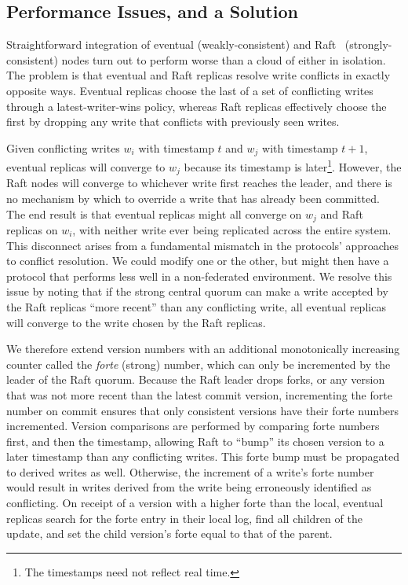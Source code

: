 \documentclass[10pt,conference,letterpaper]{IEEEtran}
\begin{document}
\subsection{Performance Issues, and a Solution}

Straightforward integration of eventual (weakly-consistent) and
Raft~\cite{ongaro_search_2014} (strongly-consistent) nodes turn out to
perform worse than a  cloud of either in isolation.
The problem is that eventual and Raft replicas resolve write conflicts in
exactly opposite ways.
Eventual replicas choose the last of a set of conflicting writes through a
latest-writer-wins policy, whereas Raft replicas effectively choose the first
by dropping any write that conflicts with previously seen writes.

Given conflicting writes $w_i$ with timestamp $t$ and $w_j$ with timestamp
$t+1$, eventual replicas will converge to $w_j$ because its timestamp is
later\footnote{The timestamps need not reflect real time.}.
However, the Raft nodes will converge to whichever write first reaches the
leader, and there is no mechanism by which to override a write that has already
been committed.
The end result is that eventual replicas might all converge on $w_j$ and
Raft replicas on $w_i$, with neither write ever being replicated across
the entire system.
This disconnect arises from a fundamental mismatch in the protocols'
approaches to conflict resolution.
We could modify one or the other, but might then have a protocol that performs
less well in a non-federated environment.
We resolve this issue by noting that if the strong central quorum can make a
write accepted by the Raft replicas ``more recent'' than any conflicting
write, all eventual replicas will converge to the write chosen by the Raft
replicas.

We therefore extend version numbers with an additional monotonically
increasing counter called the \textit{forte} (strong) number, which can only
be incremented by the leader of the Raft quorum.
Because the Raft leader drops forks, or any version that was not more recent
than the latest commit version, incrementing the forte number on commit
ensures that only consistent versions have their forte numbers incremented.
Version comparisons are performed by comparing forte
numbers first, and then the timestamp, allowing Raft to ``bump'' its chosen
version to a later timestamp than any conflicting writes.
This forte bump must be propagated to derived writes as well.
Otherwise, the increment of a write's forte number would result in writes
derived from the write being erroneously identified as conflicting.
On receipt of a version with a higher forte than the local, eventual replicas
search for the forte entry in their local log, find all children of the
update, and set the child version's forte equal to that of the parent.
\end{document}
